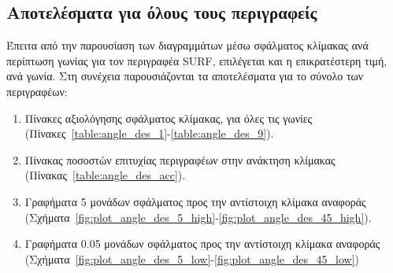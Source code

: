  \subsection{Αποτελέσματα για όλους τους περιγραφείς}

 Έπειτα από την παρουσίαση των διαγραμμάτων μέσω σφάλματος κλίμακας ανά περίπτωση γωνίας για τον περιγραφέα SURF, 
 επιλέγεται και η επικρατέστερη τιμή, ανά γωνία. Στη συνέχεια παρουσιάζονται τα αποτελέσματα 
για το σύνολο των περιγραφέων:

\begin{enumerate}
 
 \item Πίνακες αξιολόγησης σφάλματος κλίμακας, για όλες τις γωνίες (Πίνακες~\ref{table:angle_des_1}-\ref{table:angle_des_9}).
 \item Πίνακας ποσοστών επιτυχίας περιγραφέων στην ανάκτηση κλίμακας (Πίνακας~\ref{table:angle_des_acc}).
 \item Γραφήματα 5 μονάδων σφάλματος προς την αντίστοιχη κλίμακα αναφοράς (Σχήματα~\ref{fig:plot_angle_des_5_high}-\ref{fig:plot_angle_des_45_high}).
 \item Γραφήματα 0.05 μονάδων σφάλματος προς την αντίστοιχη κλίμακα αναφοράς (Σχήματα~\ref{fig:plot_angle_des_5_low}-\ref{fig:plot_angle_des_45_low})

\end{enumerate}


\vspace{2cm}


\vspace{0.5cm}

